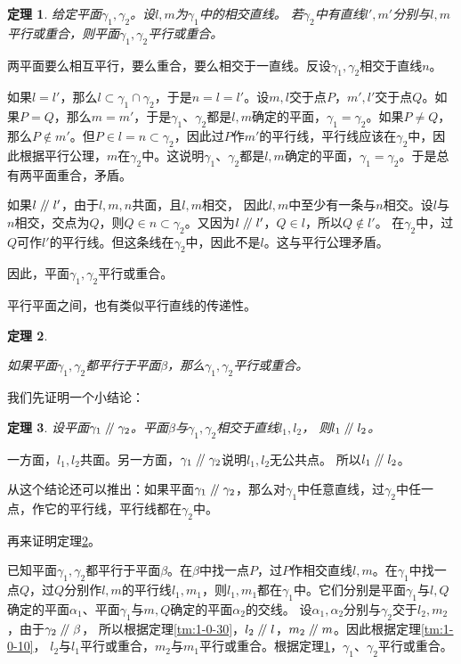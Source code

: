 \documentclass[12pt,UTF8]{ctexbook}
\newtheorem{tm}{定理}[section]
\renewcommand\parallel{\mathrel{/\mskip-4mu/}}
\begin{document}
\begin{tm}\label{tm:1-0-70}
    给定平面$\gamma_1, \gamma_2$。设$l,m$为$\gamma_1$中的相交直线。
    若$\gamma_2$中有直线$l',m'$分别与$l,m$平行或重合，则平面$\gamma_1, \gamma_2$平行或重合。
\end{tm}
\begin{proof2}
    两平面要么相互平行，要么重合，要么相交于一直线。反设$\gamma_1, \gamma_2$相交于直线$n$。

    如果$l=l'$，那么$l\subset \gamma_1\cap\gamma_2$，于是$n=l=l'$。设$m,l$交于点$P$，$m',l'$交于点$Q$。如果$P=Q$，那么$m=m'$，于是$\gamma_1$、$\gamma_2$都是$l,m$确定的平面，$\gamma_1=\gamma_2$。如果$P\neq Q$，那么$P\notin m'$。但$P\in l=n\subset\gamma_2$，因此过$P$作$m'$的平行线，平行线应该在$\gamma_2$中，因此根据平行公理，$m$在$\gamma_2$中。这说明$\gamma_1$、$\gamma_2$都是$l,m$确定的平面，$\gamma_1=\gamma_2$。于是总有两平面重合，矛盾。

    如果$l\parallel l'$，由于$l,m,n$共面，且$l,m$相交，
    因此$l,m$中至少有一条与$n$相交。设$l$与$n$相交，交点为$Q$，则$Q\in n\subset\gamma_2$。又因为$l\parallel l'$，$Q\in l$，所以$Q\notin l'$。
    在$\gamma_2$中，过$Q$可作$l'$的平行线。但这条线在$\gamma_2$中，因此不是$l$。这与平行公理矛盾。

    因此，平面$\gamma_1, \gamma_2$平行或重合。
\end{proof2}

平行平面之间，也有类似平行直线的传递性。
\begin{tm}\label{tm:1-0-80}

如果平面$\gamma_1,\gamma_2$都平行于平面$\beta$，那么$\gamma_1,\gamma_2$平行或重合。
\end{tm}
我们先证明一个小结论：
\begin{tm}\label{tm:1-0-90}
    设平面$\gamma_1\parallel \gamma_2$。平面$\beta$与$\gamma_1,\gamma_2$相交于直线$l_1,l_2$，
    则$l_1\parallel l_2$。
\end{tm}
\begin{proof2}
    一方面，$l_1,l_2$共面。另一方面，$\gamma_1\parallel \gamma_2$说明$l_1,l_2$无公共点。
    所以$l_1\parallel l_2$。
\end{proof2}

从这个结论还可以推出：如果平面$\gamma_1\parallel \gamma_2$，那么对$\gamma_1$中任意直线，过$\gamma_2$中任一点，作它的平行线，平行线都在$\gamma_2$中。

再来证明定理\ref{tm:1-0-80}。
\begin{proof2}
    已知平面$\gamma_1,\gamma_2$都平行于平面$\beta$。在$\beta$中找一点$P$，过$P$作相交直线$l,m$。在$\gamma_1$中找一点$Q$，过$Q$分别作$l,m$的平行线$l_1,m_1$，则$l_1,m_1$都在$\gamma_1$中。它们分别是平面$\gamma_1$与$l,Q$确定的平面$\alpha_1$、平面$\gamma_1$与$m,Q$确定的平面$\alpha_2$的交线。
    设$\alpha_1,\alpha_2$分别与$\gamma_2$交于$l_2,m_2$，由于$\gamma_2\parallel \beta$，
    所以根据定理\ref{tm:1-0-30}，$l_2\parallel l$，$m_2\parallel m$。因此根据定理\ref{tm:1-0-10}，
    $l_2$与$l_1$平行或重合，$m_2$与$m_1$平行或重合。根据定理\ref{tm:1-0-70}，$\gamma_1$、$\gamma_2$平行或重合。
\end{proof2}
\end{document}
